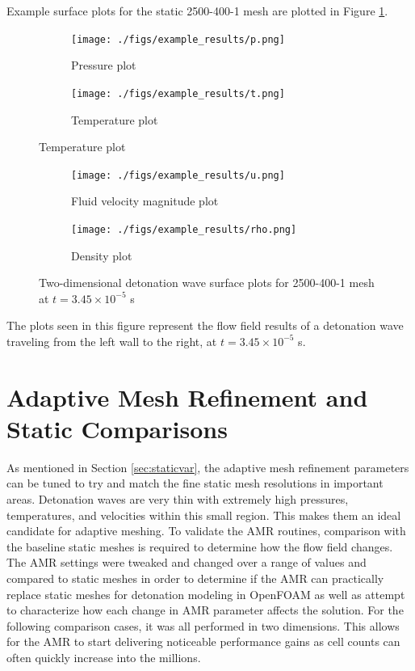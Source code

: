 Example surface plots for the static 2500-400-1 mesh are plotted in Figure \ref{fig:2dsurface}. 
\begin{figure}[]
    \centering
    \begin{subfigure}[]{\textwidth}
        \centering
        \texttt{[image: ./figs/example\_results/p.png]}
        \caption{Pressure plot}
    \end{subfigure}

    \begin{subfigure}[]{\textwidth}
        \centering
        \texttt{[image: ./figs/example\_results/t.png]}
        \caption{Temperature plot}
    \end{subfigure}

\end{figure}
\begin{figure} \ContinuedFloat
    
    \begin{subfigure}[]{\textwidth}
        \centering
        \texttt{[image: ./figs/example\_results/u.png]}
        \caption{Fluid velocity magnitude plot}
    \end{subfigure}

    \begin{subfigure}[]{\textwidth}
        \centering
        \texttt{[image: ./figs/example\_results/rho.png]}
        \caption{Density plot}
    \end{subfigure}

    \caption{Two-dimensional detonation wave surface plots for 2500-400-1 mesh at \(t = 3.45 \times 10^{ - 5} \) s}
    \label{fig:2dsurface}
\end{figure}%
\noindent The plots seen in this figure represent the flow field results of a detonation wave traveling from the left wall to the right, at \(t = 3.45 \times 10^{ - 5} \) s. 





\section{Adaptive Mesh Refinement and Static Comparisons}
As mentioned in Section \ref{sec:staticvar}, the adaptive mesh refinement parameters can be tuned to try and match the fine static mesh resolutions in important areas. Detonation waves are very thin with extremely high pressures, temperatures, and velocities within this small region. This makes them an ideal candidate for adaptive meshing. To validate the AMR routines, comparison with the baseline static meshes is required to determine how the flow field changes. The AMR settings were tweaked and changed over a range of values and compared to static meshes in order to determine if the AMR can practically replace static meshes for detonation modeling in OpenFOAM as well as attempt to characterize how each change in AMR parameter affects the solution. For the following comparison cases, it was all performed in two dimensions. This allows for the AMR to start delivering noticeable performance gains as cell counts can often quickly increase into the millions. 

